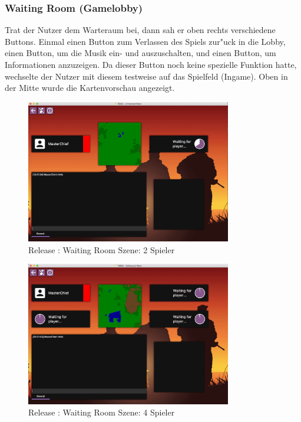 \documentclass[12pt, titlepage]{scrartcl}
\newcommand{\RN}[1]{%
	\textup{\uppercase\expandafter{\romannumeral#1}}%
}
\begin{document}
	        \subsubsection{Waiting Room (Gamelobby)} \label{WAITING_ROOM}
                Trat der Nutzer dem Warteraum bei, dann sah er oben rechts verschiedene Buttons. Einmal einen Button zum Verlassen des Spiels zur"uck in die Lobby, einen Button, um die Musik ein- und auszuschalten, und einen Button, um Informationen anzuzeigen. Da dieser Button noch keine spezielle Funktion hatte, wechselte der Nutzer mit diesem testweise auf das Spielfeld (Ingame). Oben in der Mitte wurde die Kartenvorschau angezeigt. \\
                \begin{figure}[H] 
    				\centering
    				\includegraphics[width=0.8\textwidth]{images/old_state/waiting_room/2Player.png}
    				\caption{Release \RN{2}: Waiting Room Szene: 2 Spieler}
    				\label{Waiting_Room_2}
			    \end{figure}
			    \begin{figure}[H] 
    				\centering
    				\includegraphics[width=0.8\textwidth]{images/old_state/waiting_room/4Player.png}
    				\caption{Release \RN{2}: Waiting Room Szene: 4 Spieler}
    				\label{Waiting_Room_4}
			    \end{figure}
\end{document}
